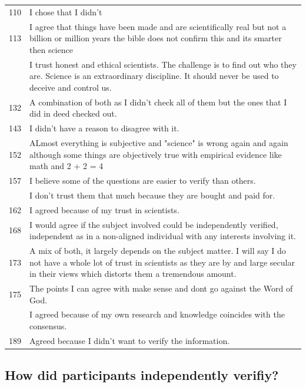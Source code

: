 \documentclass[
  doc,floatsintext]{apa6}
\begin{document}
\begin{longtable}[t]{>{}r>{\raggedright\arraybackslash}p{30em}}
110 & I chose that I didn’t\\
113 & I agree that things have been made and are scientifically real but not a billion or million years the bible does not confirm this and its smarter then science\\
\addlinespace
130 & I trust honest and ethical scientists.  The challenge is to find out who they are.  Science is an extraordinary discipline.  It should never be used to deceive and control us.\\
132 & A combination of both as I didn't check all of them but the ones that I did in deed checked out.\\
143 & I didn't have a reason to disagree with it.\\
152 & ALmost everything is subjective and "science" is wrong again and again although some things are objectively true with empirical evidence like math and 2 + 2 = 4\\
157 & I believe some of the questions are easier to verify than others.\\
\addlinespace
158 & I don't trust them that much because they are bought and paid for.\\
162 & I agreed because of my trust in scientists.\\
168 & I would agree if the subject involved could be independently verified, independent as in a non-aligned individual with any interests involving it.\\
173 & A mix of both, it largely depends on the subject matter. I will say I do not have a whole lot of trust in scientists as they are by and large secular in their views which distorts them a tremendous amount.\\
175 & The points I can agree with make sense and dont go against the Word of God.\\
\addlinespace
187 & I agreed because of my own research and knowledge coincides with the consensus.\\
189 & Agreed because I didn’t want to verify the information.\\
\bottomrule
\end{longtable}

\subsection{How did participants independently verifiy?}\label{how-did-participants-independently-verifiy-1}
\end{document}
